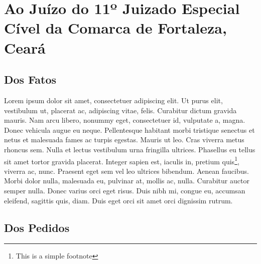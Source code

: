 \documentclass[
  12pt,
	oneside,
	a4paper,
	english,			%
	french,				%
	spanish,			%
  brazil
]{memoir}
\begin{document}
  \AddToShipoutPicture{\BackgroundPic}

\chapter{Ao Juízo do 11º Juizado Especial Cível da Comarca de Fortaleza, Ceará}

\lipsum[1]

\section{Dos Fatos}

Lorem ipsum dolor sit amet, consectetuer adipiscing elit. Ut purus elit,
vestibulum ut, placerat ac, adipiscing vitae, felis. Curabitur dictum gravida
mauris. Nam arcu libero, nonummy eget, consectetuer id, vulputate a, magna.
Donec vehicula augue eu neque. Pellentesque habitant morbi tristique senectus
et netus et malesuada fames ac turpis egestas. Mauris ut leo. Cras viverra
metus rhoncus sem. Nulla et lectus vestibulum urna fringilla ultrices.
Phasellus eu tellus sit amet tortor gravida placerat.  Integer sapien est,
iaculis in, pretium quis\footnote{This is a simple footnote}, viverra ac, nunc.
Praesent eget sem vel leo ultrices bibendum. Aenean faucibus. Morbi dolor
nulla, malesuada eu, pulvinar at, mollis ac, nulla. Curabitur auctor semper
nulla. Donec varius orci eget risus. Duis nibh mi, congue eu, accumsan
eleifend, sagittis quis, diam. Duis eget orci sit amet orci dignissim rutrum.

\begin{citacao}
\lipsum[1]
\end{citacao}

\lipsum[1-2]


\lipsum[1-2]

\section{Dos Pedidos}
\lipsum[1-3]

\hoje{}
\end{document}
